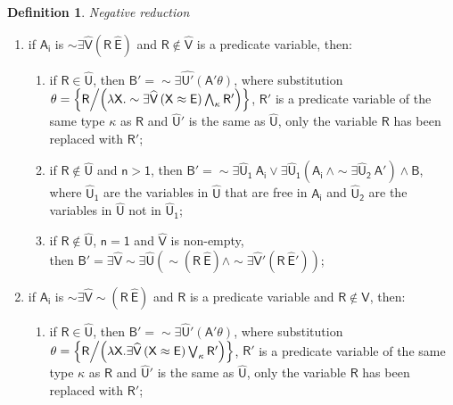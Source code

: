\documentclass[inscr,ack,preface]{dithesis}
\theoremstyle{definition}
\newtheorem{definition}{Definition}[]
\newcommand{\msf}[1]{$\mathsf{#1}$}
\begin{document}
\begin{definition}{\emph{Negative reduction}}
\begin{enumerate}
\begin{enumerate}
        \end{enumerate}
  \item if \msf{A_i} is \msf{\sim \exists \widehat{V} \left( R ~ \widehat{E} \right)} and \msf{R \not\in \widehat{V}} is a predicate variable,
        then:
        \begin{enumerate}
          \item if \msf{R \in \widehat{U}},
                then \msf{B' = \sim \exists \widehat{U'} \left( A' \theta \right)},
                where substitution \\ \msf{\theta = \left\{ R \middle/ \left( \lambda X . \sim \exists \widehat{V} \left( X \approx E \right) \bigwedge_{\kappa} R' \right) \right\}},
                \msf{R'} is a predicate variable of the same type \msf{\kappa} as \msf{R}
                and \msf{\widehat{U}'} is the same as \msf{\widehat{U}}, only the variable \msf{R} has been replaced with \msf{R'};
          \item if \msf{R \not\in \widehat{U}} and \msf{n > 1},
                then \msf{B' = \sim \exists \widehat{U}_1 ~ A_i \lor \exists \widehat{U}_1 \left( A_i ~ \land \sim \exists \widehat{U}_2 ~ A' \right) \land B},
                where \msf{\widehat{U}_1} are the variables in \msf{\widehat{U}} that are free in \msf{A_i} and \msf{\widehat{U}_2} are the variables in \msf{\widehat{U}} not in \msf{\widehat{U}_1};
          \item if \msf{R \not\in \widehat{U}}, \msf{n = 1} and \msf{\widehat{V}} is non-empty, \\
                then \msf{B' = \exists \widehat{V} \sim \exists \widehat{U} \left( \sim \left( R ~ \widehat{E} \right) \land \sim \exists \widehat{V}' \left( R ~ \widehat{E}' \right) \right)};
        \end{enumerate}
  \item if \msf{A_i} is \msf{\sim \exists \widehat{V} \sim \left( R ~ \widehat{E} \right)} and \msf{R} is a predicate variable and \msf{R \not\in \widehat{V}}, then:
        \begin{enumerate}
          \item if \msf{R \in \widehat{U}},
                then \msf{B' = \sim \exists \widehat{U}' \left( A' \theta \right)},
                where substitution \\ \msf{\theta = \left\{ R \middle/ \left( \lambda X . \exists \widehat{V} \left( X \approx E \right) \bigvee_{\kappa} R' \right) \right\}},
                \msf{R'} is a predicate variable of the same type \msf{\kappa} as \msf{R} and \msf{\widehat{U}'} is the same as \msf{\widehat{U}}, only the variable \msf{R} has been replaced with \msf{R'};

\end{enumerate}
\end{enumerate}
\end{definition}
\end{document}
